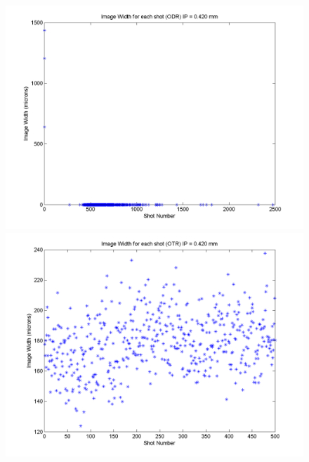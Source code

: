 \documentclass[12pt]{article}
\begin{document}
\begin{figure}
\begin{center}
\includegraphics[scale=0.5]{Figures/ImageWidth_ODR_420.PNG}
\includegraphics[scale=0.5]{Figures/ImageWidth_OTR_420.PNG}
\caption{}
\end{center}
\end{figure}
\end{document}
